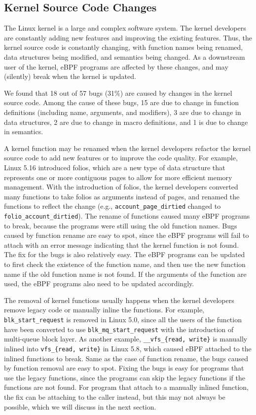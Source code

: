 \subsection{Kernel Source Code Changes}
The Linux kernel is a large and complex software system.
The kernel developers are constantly adding new features and improving the existing features.
Thus, the kernel source code is constantly changing, with function names being renamed, data structures being modified, and semantics being changed.
As a downstream user of the kernel, eBPF programs are affected by these changes, and may (silently) break when the kernel is updated.

We found that 18 out of 57 bugs (31\%) are caused by changes in the kernel source code.
Among the cause of these bugs, 15 are due to change in function definitions (including name, arguments, and modifiers), 3 are due to change in data structures, 2 are due to change in macro definitions, and 1 is due to change in semantics. 

A kernel function may be renamed when the kernel developers refactor the kernel source code to add new features or to improve the code quality.
For example, Linux 5.16 introduced folios, which are a new type of data structure that represents one or more contiguous pages to allow for more efficient memory management.
With the introduction of folios, the kernel developers converted many functions to take folios as arguments instead of pages, and renamed the functions to reflect the change (e.g., \texttt{account\_page\_dirtied} changed to \texttt{folio\_account\_dirtied}).
The rename of functions caused many eBPF programs to break, because the programs were still using the old function names.
Bugs caused by function rename are easy to spot, since the eBPF programs will fail to attach with an error message indicating that the kernel function is not found. 
The fix for the bugs is also relatively easy. The eBPF programs can be updated to first check the existence of the function name, and then use the new function name if the old function name is not found. 
If the arguments of the function are used, the eBPF programs also need to be updated accordingly.

The removal of kernel functions usually happens when the kernel developers remove legacy code or manually inline the functions.
For example, \texttt{blk\_start\_request} is removed in Linux 5.0, since all the users of the function have been converted to use \texttt{blk\_mq\_start\_request} with the introduction of multi-queue block layer.
As another example, \texttt{\_\_vfs\_\{read, write\}} is manually inlined into \texttt{vfs\_\{read, write\}} in Linux 5.8, which caused eBPF attached to the inlined functions to break.
Same as the case of function rename, the bugs caused by function removal are easy to spot. 
Fixing the bugs is easy for programs that use the legacy functions, since the programs can skip the legacy functions if the functions are not found.
For program that attach to a manually inlined function, the fix can be attaching to the caller instead, but this may not always be possible, which we will discuss in the next section.

